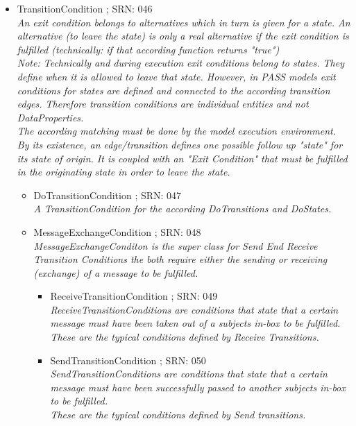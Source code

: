 \begin{itemize}
\begin{itemize}
\begin{itemize}
\begin{itemize}
\begin{itemize}
				\end{itemize}
				\item TransitionCondition ; SRN: 046 \\ \textit{An exit condition belongs to alternatives which in turn is given for a state. An alternative (to leave the state) is only a real alternative if the exit condition is fulfilled (technically: if that according function returns "true") \\Note: Technically and during execution exit conditions belong to states. They define when it is allowed to leave that state. However, in PASS models exit conditions for states are defined and connected to the according transition edges. Therefore transition conditions are individual entities and not DataProperties.\\ The according matching must be done by the model execution environment.\\ By its existence, an edge/transition defines one possible follow up "state" for its state of origin. It is coupled with an "Exit Condition" that must be fulfilled in the originating state in order to leave the state.}
				\begin{itemize}
					\item DoTransitionCondition ; SRN: 047 \\ \textit{A TransitionCondition for the according DoTransitions and DoStates. }
					\item MessageExchangeCondition ; SRN: 048 \\ \textit{MessageExchangeConditon is the super class for Send End Receive Transition Conditions the both require either the sending or receiving (exchange) of a message to be fulfilled.}
					\begin{itemize}
						\item ReceiveTransitionCondition ; SRN: 049 \\ \textit{ReceiveTransitionConditions are conditions that state that a certain message must have been taken out of a subjects in-box to be fulfilled.\\ These are the typical conditions defined by Receive Transitions.}
						\item SendTransitionCondition ; SRN: 050 \\ \textit{SendTransitionConditions are conditions that state that a certain message must have been successfully passed to another subjects in-box to be fulfilled.\\ These are the typical conditions defined by Send transitions.}
						\end {itemize}

\end{itemize}
\end{itemize}
\end{itemize}
\end{itemize}
\end{itemize}
